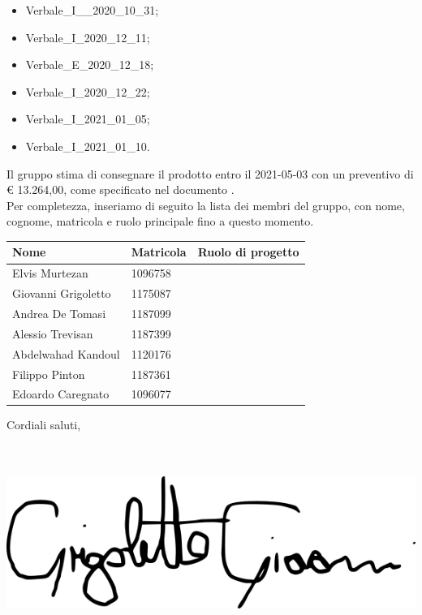 \documentclass[a4paper, oneside, openany, dvipsnames, table,11pt]{letter}
\begin{document}
\begin{letter}
\begin{itemize}
            \item Verbale\_I\_\_2020\_10\_31;
            \item Verbale\_I\_2020\_12\_11;
            \item Verbale\_E\_2020\_12\_18;
            \item Verbale\_I\_2020\_12\_22;
           \item Verbale\_I\_2021\_01\_05;
           \item Verbale\_I\_2021\_01\_10.
        \end{itemize}
        Il gruppo stima di consegnare il prodotto entro il 2021-05-03 con un preventivo di \euro{} 13.264,00, come specificato nel documento \PdP{}.\\
        Per completezza, inseriamo di seguito la lista dei membri del gruppo, con nome, cognome, matricola e ruolo principale fino a questo momento.
        {
            \renewcommand{\arraystretch}{2}
            \begin{longtable}{ C{4cm} C{3cm} C{6cm} }
                \rowcolor{\primaryColor}
                \textcolor{\secondaryColor}{\textbf{Nome}} & \textcolor{\secondaryColor}{\textbf{Matricola}} & \textcolor{\secondaryColor}{\textbf{Ruolo di progetto}}\\
                \endhead 
                {Elvis Murtezan} & 1096758 & \responsabile{}  \\   
                {Giovanni Grigoletto} & 1175087 & \responsabile{}  \\    
                {Andrea De Tomasi} & 1187099 & \verificatore{}   \\    
                {Alessio Trevisan} & 1187399 & \analista{}  \\    
                {Abdelwahad Kandoul} & 1120176 & \verificatore{}  \\    
                {Filippo Pinton} & 1187361 &   \amministratore{}  \\    
                {Edoardo Caregnato} & 1096077 & \analista{}  \\       
            \end{longtable}
        }
        Cordiali saluti,
        \closing{\GG{} \\ \textit{\responsabile{}}\\ \includegraphics[width=.6\linewidth]{../PianodiProgetto/src/Organigramma/immagini/firme/giovanni.png}}
    \end{letter}
\end{document}
